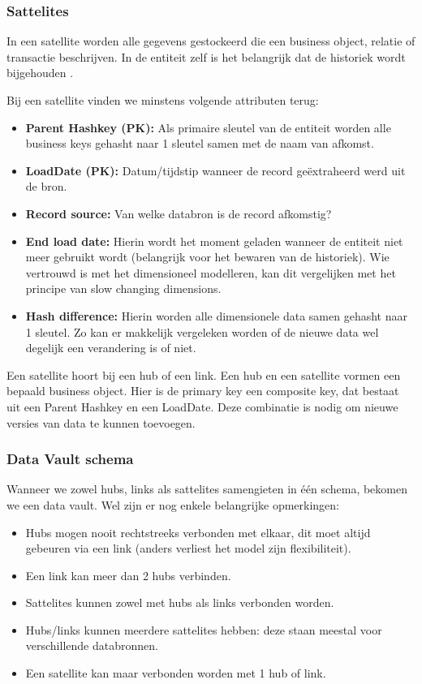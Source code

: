\subsubsection{Sattelites}
In een satellite worden alle gegevens gestockeerd die een business object, relatie of transactie beschrijven. In de entiteit zelf is het belangrijk dat de historiek wordt bijgehouden \autocite{Linstedt2016}.

Bij een satellite vinden we minstens volgende attributen terug:

\begin{itemize}
	\item \textbf{Parent Hashkey (PK):} Als primaire sleutel van de entiteit worden alle business keys gehasht naar 1 sleutel samen met de naam van afkomst.
	\item \textbf{LoadDate (PK):} Datum/tijdstip wanneer de record geëxtraheerd werd uit de bron.
	\item \textbf{Record source:} Van welke databron is de record afkomstig?
	\item \textbf{End load date:} Hierin wordt het moment geladen wanneer de entiteit niet meer gebruikt wordt (belangrijk voor het bewaren van de historiek). Wie vertrouwd is met het dimensioneel modelleren, kan dit vergelijken met het principe van slow changing dimensions.
	\item \textbf{Hash difference:} Hierin worden alle dimensionele data samen gehasht naar 1 sleutel. Zo kan er makkelijk vergeleken worden of de nieuwe data wel degelijk een verandering is of niet.
\end{itemize} 

Een satellite hoort bij een hub of een link. Een hub en een satellite vormen een bepaald business object. Hier is de primary key een composite key, dat bestaat uit een Parent Hashkey en een LoadDate. Deze combinatie is nodig om nieuwe versies van data te kunnen toevoegen.

\subsubsection{Data Vault schema}
Wanneer we zowel hubs, links als sattelites samengieten in één schema, bekomen we een data vault. Wel zijn er nog enkele belangrijke opmerkingen:

\begin{itemize}
	\item Hubs mogen nooit rechtstreeks verbonden met elkaar, dit moet altijd gebeuren via een link (anders verliest het model zijn flexibiliteit).
	\item Een link kan meer dan 2 hubs verbinden.
	\item Sattelites kunnen zowel met hubs als links verbonden worden.
	\item Hubs/links kunnen meerdere sattelites hebben: deze staan meestal voor verschillende databronnen.
	\item Een satellite kan maar verbonden worden met 1 hub of link. 
\end{itemize} 

